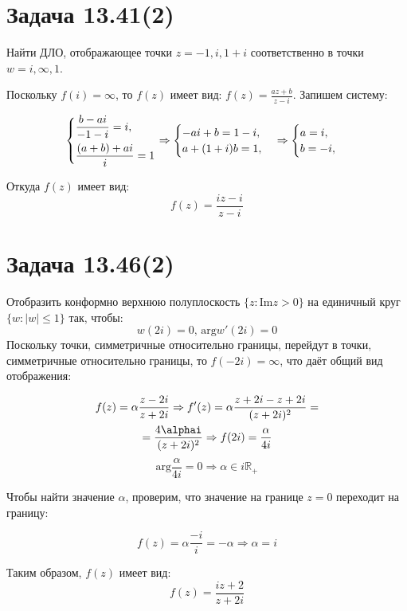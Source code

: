 \documentclass[11pt]{article}
\begin{document}
\section{Задача 13.41(2)}
\label{sec:orgf2483ae}
Найти ДЛО, отображающее точки \(z = -1, i, 1 + i\) соответственно в точки \(w = i, \infty, 1\).

Поскольку \(f(i) = \infty\), то \(f(z)\) имеет вид:
\(f(z) = \frac{az + b}{z - i}\). Запишем систему:
\begin{LaTeX}
\begin{multline*}
\begin{dcases}
\frac{b - ai}{-1 - i} = i, \\
\frac{(a + b) + ai}i = 1
\end{dcases}
\Rightarrow
\begin{cases}
-ai + b = 1 - i, \\
a + (1 + i)b = 1,
\end{cases}
\Rightarrow
\begin{cases}
a = i, \\
b = -i,
\end{cases}
\end{multline*}
\end{LaTeX}
Откуда \(f(z)\) имеет вид:
$$f(z) = \frac{iz - i}{z - i}$$
\section{Задача 13.46(2)}
\label{sec:org2c7e6ea}
Отобразить конформно верхнюю полуплоскость \(\{z : \mathrm{Im} z > 0\}\) на единичный круг \(\{w : |w| \leq 1\}\)
так, чтобы:
$$w(2i) = 0, \,\mathrm{arg}w'(2i) = 0$$
Поскольку точки, симметричные относительно границы, перейдут в точки, симметричные относительно границы, то \(f(-2i) = \infty\),
что даёт общий вид отображения:
\begin{LaTeX}
\begin{multline*}
f(z) = \alpha\frac{z - 2i}{z + 2i} \Rightarrow f'(z) = \alpha\frac{z + 2i - z + 2i}{(z + 2i)^2} = \\
= \frac{4\alphai}{(z + 2i)^2} \Rightarrow f(2i) = \frac{\alpha}{4i}
\end{multline*}
$$\mathrm{arg}\frac{\alpha}{4i} = 0 \Rightarrow \alpha \in i\mathbb{R}_+$$
\end{LaTeX}
Чтобы найти значение \(\alpha\), проверим, что значение на границе \(z = 0\) переходит на границу:
\begin{latex}
$$f(z) = \alpha\frac{-i}{i} = -\alpha \Rightarrow \alpha = i$$
\end{latex}
Таким образом, \(f(z)\) имеет вид:
$$f(z) = \frac{iz + 2}{z + 2i}$$
\end{document}
